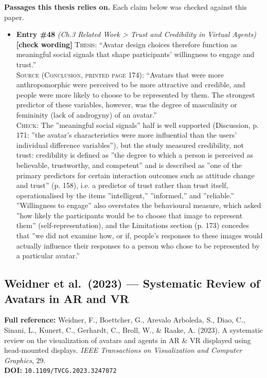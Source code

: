 \documentclass[11pt, a4paper]{article}
\begin{document}
\textbf{Passages this thesis relies on.} Each claim below was checked against this paper.
\begin{itemize}[leftmargin=1.2em,itemsep=4pt]
\item \textbf{Entry \#48} \textit{(Ch.3 Related Work > Trust and Credibility in Virtual Agents)}\\
\textcolor{partialorange}{\textbf{[check wording]}} \textsc{Thesis:} ``Avatar design choices therefore function as meaningful social signals that shape participants' willingness to engage and trust.''\\
\textsc{Source (Conclusion, printed page 174):} ``Avatars that were more anthropomorphic were perceived to be more attractive and credible, and people were more likely to choose to be represented by them. The strongest predictor of these variables, however, was the degree of masculinity or femininity (lack of androgyny) of an avatar.''\\
\textsc{Check:} The ”meaningful social signals” half is well supported (Discussion, p. 171: ”the avatar's characteristics were more influential than the users' individual difference variables”), but the study measured credibility, not trust: credibility is defined as ”the degree to which a person is perceived as believable, trustworthy, and competent” and is described as ”one of the primary predictors for certain interaction outcomes such as attitude change and trust” (p. 158), i.e. a predictor of trust rather than trust itself, operationalised by the items ”intelligent,” ”informed,” and ”reliable.” ”Willingness to engage” also overstates the behavioural measure, which asked ”how likely the participants would be to choose that image to represent them” (self-representation), and the Limitations section (p. 173) concedes that ”we did not examine how, or if, people's responses to these images would actually influence their responses to a person who chose to be represented by a particular avatar.”
\end{itemize}

\vspace{8pt}
\subsection{Weidner et al.\ (2023) --- Systematic Review of Avatars in AR and VR}

\begin{refbox}
\textbf{Full reference:} Weidner, F., Boettcher, G., Arevalo Arboleda, S., Diao, C., Sinani, L., Kunert, C., Gerhardt, C., Broll, W., \& Raake, A. (2023). A systematic review on the visualization of avatars and agents in AR \& VR displayed using head-mounted displays. \textit{IEEE Transactions on Visualization and Computer Graphics}, 29.\\[4pt]
\textbf{DOI:} \texttt{10.1109/TVCG.2023.3247072}
\end{refbox}
\end{document}
